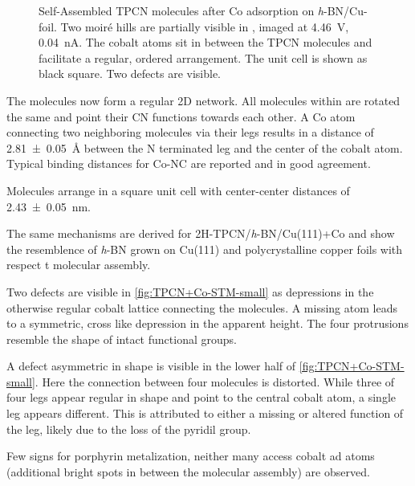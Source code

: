 \begin{figure}[!h]
{	  	\label{fig:TPCN+Co-STM-small-model}
  	}
  	\caption{Self-Assembled TPCN molecules after Co adsorption on \textit{h}-BN/Cu-foil. Two moir\'e hills are partially visible in , imaged at \SI{4.46}{\volt}, \SI{0.04}{\nano\ampere}.  The cobalt atoms sit in between the TPCN molecules and facilitate a regular, ordered arrangement. The unit cell is shown as black square. Two defects are visible.}
  	\label{fig:TPCN+Co-STM}
  \end{figure}
 
The molecules now form a regular 2D network. All molecules within are rotated the same and point their CN functions towards each other. A Co atom connecting two neighboring molecules via their legs results in a distance of \SI{2.81 \pm 0.05}{\angstrom} between the N terminated leg and the center of the cobalt atom. Typical binding distances for Co-NC are reported \cite{schlickum_metalorganic_2007, przychodzen_supramolecular_2006} and in good agreement.

Molecules arrange in a square unit cell with center-center distances of \SI{2.43 \pm 0.05}{\nano \meter}.  

The same mechanisms are derived for 2H-TPCN/\textit{h}-BN/Cu(111)+Co \cite{urgel_controlling_2015} and show the resemblence of \textit{h}-BN grown on Cu(111) and polycrystalline copper foils with respect t molecular assembly.

Two defects are visible in \autoref{fig:TPCN+Co-STM-small} as depressions in the otherwise regular cobalt lattice connecting the molecules. A missing atom leads to a symmetric, cross like depression in the apparent height. The four protrusions resemble the shape of intact functional groups.

A defect asymmetric in shape is visible in the lower half of \autoref{fig:TPCN+Co-STM-small}. Here the connection between four molecules is distorted. While three of four legs appear regular in shape and point to the central cobalt atom, a single leg appears different. This is attributed to either a missing or altered function of the leg, likely due to the loss of the pyridil group.

Few signs for porphyrin metalization, neither many access cobalt ad atoms (additional bright spots in between the molecular assembly) are observed. 

  
